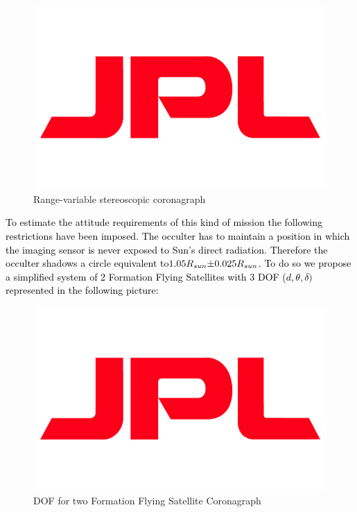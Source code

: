 \begin{figure}[!ht]
\begin{centering}
\includegraphics[scale=0.8]{jpl_logo.jpg}\caption{Range-variable stereoscopic coronagraph}
\par\end{centering}
\end{figure}

\textcolor{black}{To estimate the attitude requirements of this kind
of mission the following restrictions have been imposed. The occulter
has to maintain a position in which the imaging sensor is never exposed
to Sun's direct radiation. Therefore the occulter shadows a circle
equivalent to$1.05R_{sun}\text{\textpm}0.025R_{sun}$. To do so we
propose a simplified system of 2 Formation Flying Satellites with
3 DOF ($d,\theta,\delta)$ represented in the following picture:}


\begin{figure}[!ht]
\begin{centering}
\includegraphics[scale=0.75]{jpl_logo.jpg}\caption{DOF for two Formation Flying Satellite Coronagraph}
\end{centering}
\end{figure}


